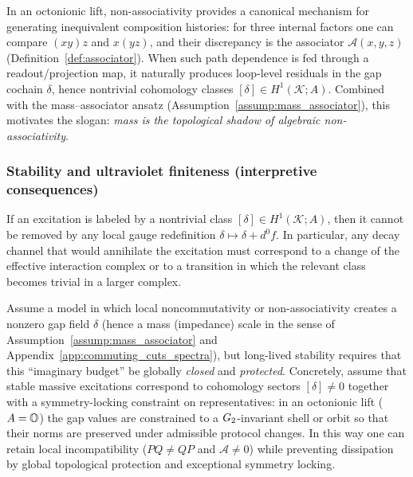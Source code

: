 \begin{remark}
In an octonionic lift, non-associativity provides a canonical mechanism for generating inequivalent composition histories: for three internal factors one can compare $(xy)z$ and $x(yz)$, and their discrepancy is the associator $\mathcal{A}(x,y,z)$ (Definition~\ref{def:associator}).
When such path dependence is fed through a readout/projection map, it naturally produces loop-level residuals in the gap cochain $\delta$, hence nontrivial cohomology classes $[\delta]\in H^1(\mathcal{K};A)$.
Combined with the mass--associator ansatz (Assumption~\ref{assump:mass_associator}), this motivates the slogan: \emph{mass is the topological shadow of algebraic non-associativity}.
\end{remark}

\subsubsection{Stability and ultraviolet finiteness (interpretive consequences)}
\begin{corollary}
\label{cor:gap_topological_stability}
If an excitation is labeled by a nontrivial class $[\delta]\in H^1(\mathcal{K};A)$, then it cannot be removed by any local gauge redefinition $\delta\mapsto\delta+d^0 f$.
In particular, any decay channel that would annihilate the excitation must correspond to a change of the effective interaction complex or to a transition in which the relevant class becomes trivial in a larger complex.
\end{corollary}

\begin{assumption}
\label{assump:locked_impedance}
Assume a model in which local noncommutativity or non-associativity creates a nonzero gap field $\delta$ (hence a mass (impedance) scale in the sense of Assumption~\ref{assump:mass_associator} and Appendix~\ref{app:commuting_cuts_spectra}), but long-lived stability requires that this ``imaginary budget'' be globally \emph{closed} and \emph{protected}.
Concretely, assume that stable massive excitations correspond to cohomology sectors $[\delta]\ne 0$ together with a symmetry-locking constraint on representatives: in an octonionic lift ($A=\mathbb{O}$) the gap values are constrained to a $G_2$-invariant shell or orbit so that their norms are preserved under admissible protocol changes.
In this way one can retain local incompatibility ($PQ\ne QP$ and $\mathcal{A}\ne 0$) while preventing dissipation by global topological protection and exceptional symmetry locking.
\end{assumption}

